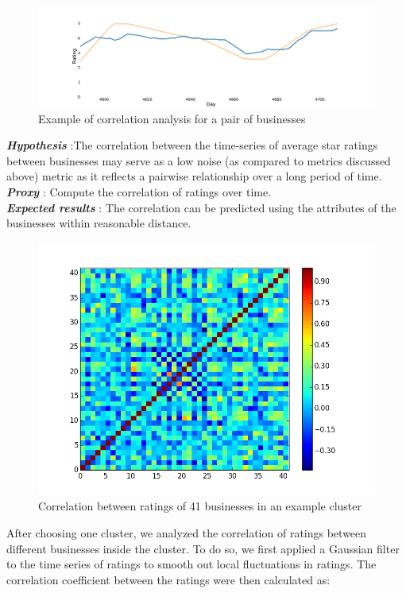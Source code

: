 \documentclass{vldb}
\begin{document}
\begin{figure}[h]
\centering
\includegraphics[width=\columnwidth]{corr.pdf}
\caption{Example of correlation analysis for a pair of businesses}
\end{figure}

\textbf{\textit{Hypothesis}} :The correlation between the  time-series of average star ratings between businesses may serve as a low noise (as compared to metrics discussed above) metric as it reflects a pairwise relationship over a long period of time.\\
\textbf{\textit{Proxy}} : Compute the correlation of ratings over time.\\
\textbf{\textit{Expected results}} : The correlation can be predicted using the attributes of the businesses within reasonable distance. 

\begin{figure}
\centering
\includegraphics[width=\columnwidth]{cov_cluster_28}
\caption{Correlation between ratings of 41 businesses in an example cluster}
\label{fig:covmat}
\end{figure}
After choosing one cluster, we analyzed the correlation of ratings between different businesses inside the cluster.
To do so, we first applied a Gaussian filter to the time series of ratings to smooth out local fluctuations in ratings. The correlation coefficient between the ratings were then calculated as:
\end{document}
